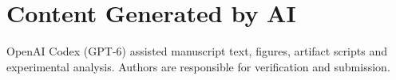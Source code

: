 \section*{Content Generated by AI}
OpenAI Codex (GPT-6) assisted manuscript text, figures, artifact scripts and experimental analysis. Authors are responsible for verification and submission.
